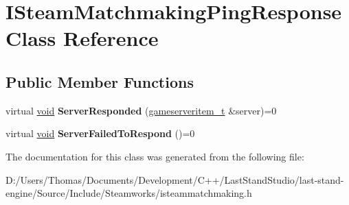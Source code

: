 \hypertarget{classISteamMatchmakingPingResponse}{}\section{I\+Steam\+Matchmaking\+Ping\+Response Class Reference}
\label{classISteamMatchmakingPingResponse}
\subsection*{Public Member Functions}
\begin{DoxyCompactItemize}
\item 
\hypertarget{classISteamMatchmakingPingResponse_a5b6143aadde3fc7092afc404036b2185}{}virtual \hyperlink{SDL__audio_8h_a52835ae37c4bb905b903cbaf5d04b05f}{void} {\bfseries Server\+Responded} (\hyperlink{classgameserveritem__t}{gameserveritem\+\_\+t} \&server)=0\label{classISteamMatchmakingPingResponse_a5b6143aadde3fc7092afc404036b2185}

\item 
\hypertarget{classISteamMatchmakingPingResponse_a08ec212599b9d76512a98ce9f90c69c8}{}virtual \hyperlink{SDL__audio_8h_a52835ae37c4bb905b903cbaf5d04b05f}{void} {\bfseries Server\+Failed\+To\+Respond} ()=0\label{classISteamMatchmakingPingResponse_a08ec212599b9d76512a98ce9f90c69c8}

\end{DoxyCompactItemize}


The documentation for this class was generated from the following file\+:\begin{DoxyCompactItemize}
\item 
D\+:/\+Users/\+Thomas/\+Documents/\+Development/\+C++/\+Last\+Stand\+Studio/last-\/stand-\/engine/\+Source/\+Include/\+Steamworks/isteammatchmaking.\+h\end{DoxyCompactItemize}
